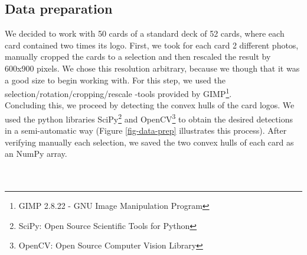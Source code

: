 \documentclass[a4paper]{article}
\begin{document}
\subsection*{Data preparation}
We decided to work with 50 cards of a standard deck of 52 cards, where each card contained two times its logo.  First, we took for each card 2 different photos, manually cropped the cards to a selection and then rescaled the result by 600x900 pixels.  We chose this resolution arbitrary, because we though that it was a good size to begin working with.
For this step, we used the selection/rotation/cropping/rescale -tools provided by GIMP\footnote{GIMP 2.8.22 - GNU Image Manipulation Program}. \\
Concluding this, we proceed by detecting the convex hulls of the card logos.   We used the python libraries SciPy\footnote{SciPy: Open Source Scientific Tools for Python} and OpenCV\footnote{OpenCV: Open Source Computer Vision Library} to obtain the desired detections in a semi-automatic way (Figure \ref{fig-data-prep} illustrates this process).  After verifying manually each selection, we saved the two convex hulls of each card as an NumPy array. \\
\\ \\
\end{document}

